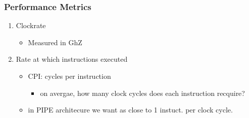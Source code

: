 \documentclass[11pt]{article}
\begin{document}
\subsubsection{Performance Metrics}
\label{sec:orgheadline59}
\begin{enumerate}
\item Clockrate
\label{sec:orgheadline57}
\begin{itemize}
\item Measured in GhZ
\end{itemize}
\item Rate at which instructions executed
\label{sec:orgheadline58}
\begin{itemize}
\item CPI: cycles per instruction
\begin{itemize}
\item on avergae, how many clock cycles does each instruction recquire?
\end{itemize}
\item in PIPE architecure we want as close to 1 instuct. per clock cycle.
\end{itemize}
\end{enumerate}
\end{document}

